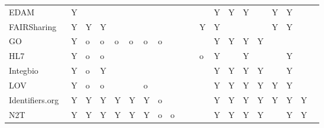 \begin{table}
\begin{tabular}{llllllllllllllllllll}
                   EDAM~\cite{Ison2013} &              Y &          &       &            &            &          &                &               &         &         &         &                          Y &         Y &                 Y &                    &             Y &               Y &                &               \\
         FAIRSharing~\cite{Sansone2019} &              Y &        Y &     Y &            &            &          &                &               &         &         &       Y &                          Y &           &                   &                    &             Y &               Y &                &               \\
GO~\cite{TheGeneOntologyConsortium2019} &              Y &        o &     o &          o &          o &        o &              o &               &         &         &         &                          Y &         Y &                 Y &                  Y &               &                 &                &               \\
                  HL7~\cite{Bender2013} &              Y &        o &     o &            &            &          &                &               &         &         &       o &                          Y &           &                 Y &                    &               &               Y &                &               \\
                               Integbio &              Y &        o &     Y &            &            &          &                &               &         &         &         &                          Y &         Y &                 Y &                  Y &               &               Y &                &               \\
                                    LOV &              Y &        o &     o &            &            &        o &                &               &         &         &         &                          Y &         Y &                 Y &                  Y &             Y &               Y &                &               \\
        Identifiers.org~\cite{Juty2012} &              Y &        Y &     Y &          Y &          Y &        Y &              o &               &         &         &         &                          Y &         Y &                 Y &                  Y &             Y &               Y &              Y &               \\
             N2T~\cite{Wimalaratne2018} &              Y &        Y &     Y &          Y &          Y &        Y &              o &             o &         &         &         &                          Y &         Y &                 Y &                  Y &               &               Y &              Y &               \\

\end{tabular}
\end{table}

